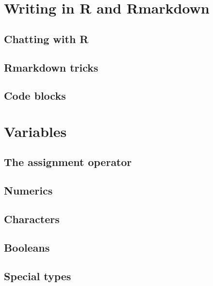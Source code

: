 \documentclass[
]{book}
\begin{document}
\hypertarget{writing-in-r-and-rmarkdown}{%
\section{Writing in R and Rmarkdown}\label{writing-in-r-and-rmarkdown}}

\hypertarget{chatting-with-r}{%
\subsection{Chatting with R}\label{chatting-with-r}}

\hypertarget{rmarkdown-tricks}{%
\subsection{Rmarkdown tricks}\label{rmarkdown-tricks}}

\hypertarget{code-blocks}{%
\subsection{Code blocks}\label{code-blocks}}

\hypertarget{variables}{%
\section{Variables}\label{variables}}

\hypertarget{the-assignment-operator}{%
\subsection{The assignment operator}\label{the-assignment-operator}}

\hypertarget{numerics}{%
\subsection{Numerics}\label{numerics}}

\hypertarget{characters}{%
\subsection{Characters}\label{characters}}

\hypertarget{booleans}{%
\subsection{Booleans}\label{booleans}}

\hypertarget{special-types}{%
\subsection{Special types}\label{special-types}}
\end{document}
